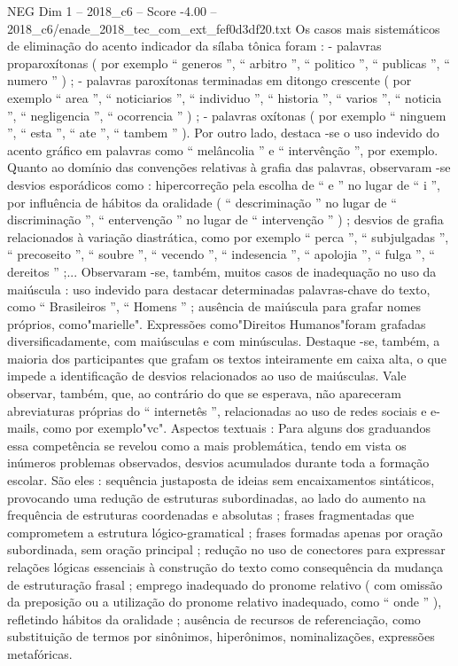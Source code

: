 \begin{textsample}{NEG Dim 1 – 2018\_c6 – Score -4.00 – 2018\_c6/enade\_2018\_tec\_com\_ext\_fef0d3df20.txt}
Os casos mais sistemáticos de eliminação do acento indicador da sílaba tônica foram : - palavras proparoxítonas ( por exemplo “ generos ”, “ arbitro ”, “ politico ”, “ publicas ”, “ numero ” ) ; - palavras paroxítonas terminadas em ditongo crescente ( por exemplo “ area ”, “ noticiarios ”, “ individuo ”, “ historia ”, “ varios ”, “ noticia ”, “ negligencia ”, “ ocorrencia ” ) ; - palavras oxítonas ( por exemplo “ ninguem ”, “ esta ”, “ ate ”, “ tambem ” ).
Por outro lado, destaca -se o uso indevido do acento gráfico em palavras como “ melâncolia ” e “ intervênção ”, por exemplo.
Quanto ao domínio das convenções relativas à grafia das palavras, observaram -se desvios esporádicos como : hipercorreção pela escolha de “ e ” no lugar de “ i ”, por influência de hábitos da oralidade ( “ descriminação ” no lugar de “ discriminação ”, “ entervenção ” no lugar de “ intervenção ” ) ; desvios de grafia relacionados à variação diastrática, como por exemplo “ perca ”, “ subjulgadas ”, “ precoseito ”, “ soubre ”, “ vecendo ”, “ indesencia ”, “ apolojia ”, “ fulga ”, “ dereitos ” ;...
Observaram -se, também, muitos casos de inadequação no uso da maiúscula : uso indevido para destacar determinadas palavras-chave do texto, como “ Brasileiros ”, “ Homens ” ; ausência de maiúscula para grafar nomes próprios, como"marielle".
Expressões como"Direitos Humanos"foram grafadas diversificadamente, com maiúsculas e com minúsculas.
Destaque -se, também, a maioria dos participantes que grafam os textos inteiramente em caixa alta, o que impede a identificação de desvios relacionados ao uso de maiúsculas.
Vale observar, também, que, ao contrário do que se esperava, não apareceram abreviaturas próprias do “ internetês ”, relacionadas ao uso de redes sociais e e-mails, como por exemplo"vc".
Aspectos textuais : Para alguns dos graduandos essa competência se revelou como a mais problemática, tendo em vista os inúmeros problemas observados, desvios acumulados durante toda a formação escolar.
São eles : sequência justaposta de ideias sem encaixamentos sintáticos, provocando uma redução de estruturas subordinadas, ao lado do aumento na frequência de estruturas coordenadas e absolutas ; frases fragmentadas que comprometem a estrutura lógico-gramatical ; frases formadas apenas por oração subordinada, sem oração principal ; redução no uso de conectores para expressar relações lógicas essenciais à construção do texto como consequência da mudança de estruturação frasal ; emprego inadequado do pronome relativo ( com omissão da preposição ou a utilização do pronome relativo inadequado, como “ onde ” ), refletindo hábitos da oralidade ; ausência de recursos de referenciação, como substituição de termos por sinônimos, hiperônimos, nominalizações, expressões metafóricas.

\end{textsample}
